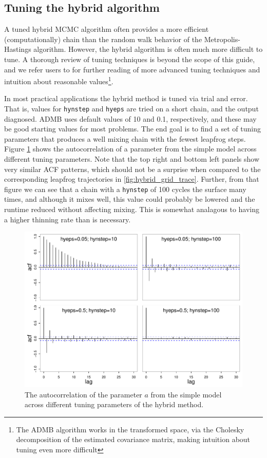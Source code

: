 \documentclass{article}\usepackage[]{graphicx}\usepackage[]{color}
\begin{document}
\subsection{Tuning the hybrid algorithm}\label{sec:Hybridtuning}
A tuned hybrid MCMC algorithm often provides a more
efficient (computationally) chain than the random walk
behavior of the Metropolis-Hastings algorithm. However, the
hybrid algorithm is often much more difficult to tune. A
thorough review of tuning techniques is beyond the scope of
this guide, and we refer users to \cite{brooks2011} for
further reading of more advanced tuning techniques and
intuition about reasonable values\footnote{The ADMB
  algorithm works in the transformed space, via the Cholesky
  decomposition of the estimated covariance matrix, making
  intuition about tuning even more difficult}.

In most practical applications the hybrid method is tuned
via trial and error. That is, values for \texttt{hynstep}
and \texttt{hyeps} are tried on a short chain, and the
output diagnosed. ADMB uses default values of 10 and 0.1,
respectively, and these may be good starting values for most
problems. The end goal is to find a set of tuning parameters
that produces a well mixing chain with the fewest leapfrog
steps. Figure \ref{fig:hybrid_grid_acf} shows the
autocorrelation of a parameter from the simple model across
different tuning parameters. Note that the top right and
bottom left panels show very similar ACF patterns, which
should not be a surprise when compared to the corresponding
leapfrog trajectories in
\ref{fig:hybrid_grid_trace}. Further, from that figure we
can see that a chain with a \texttt{hynstep} of 100 cycles
the surface many times, and although it mixes well, this
value could probably be lowered and the runtime reduced
without affecting mixing. This is somewhat analagous to
having a higher thinning rate than is necessary.

\begin{figure}[h]
  \centering
  \includegraphics[width=5in]{../plots/hybrid_grid_acf.pdf}
  \caption{The autocorrelation of the parameter $a$ from the simple model
    across different tuning parameters of the hybrid method.}
  \label{fig:hybrid_grid_acf}
\end{figure}
\end{document}
